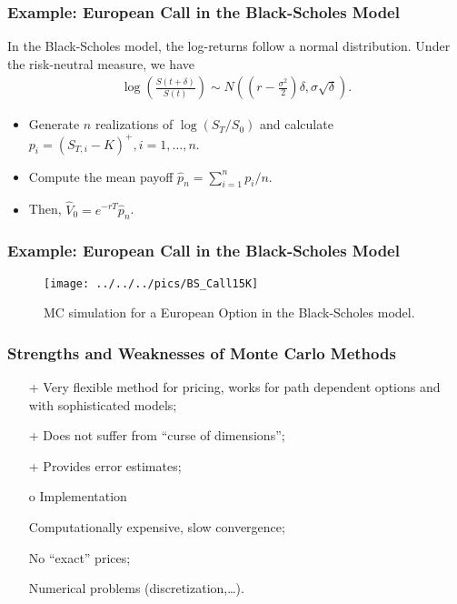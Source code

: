 \begin{frame}[fragile]
\frametitle{Example: European Call in the Black-Scholes Model}
In the Black-Scholes model, the log-returns follow a normal distribution. Under
the risk-neutral measure, we have
\begin{align*}
  \log\left(\frac{S(t+\delta)}{S(t)} \right) \sim
  N\left(\left( r-\frac{\sigma^2}{2}\right)\delta,\sigma \sqrt{\delta}\right).
\end{align*}
\begin{itemize}
  \item Generate $n$ realizations of $\log(S_{T}/S_0)$ and calculate
  $p_i=(S_{T,i}-K)^+, i=1,\ldots,n$.
  \item Compute the mean payoff $\hat{p}_n=\sum_{i=1}^n p_i/n$.
  \item Then, $\hat{V}_0 = e^{-rT}\hat{p}_n$.
\end{itemize}
\end{frame}



\begin{frame}[fragile]
\frametitle{Example: European Call in the Black-Scholes Model}
\begin{figure}[htp]
\begin{center}
  \texttt{[image: ../../../pics/BS\_Call15K]}
  \caption{MC simulation for a European Option in the Black-Scholes model.}
\end{center}
\end{figure}
\end{frame}


\begin{frame}[fragile]
\frametitle{Strengths and Weaknesses of Monte Carlo Methods}
\begin{itemize}
  \item[+] Very flexible method for pricing, works for path dependent options
  and with sophisticated models;
  \item[+] Does not suffer from ``curse of dimensions'';
  \item[+] Provides error estimates;
  \item[o\hspace{1px}] Implementation
  \item[\textendash\hspace{1px}] Computationally expensive, slow convergence;
  \item[\textendash\hspace{1px}] No ``exact'' prices;
  \item[\textendash\hspace{1px}] Numerical problems (discretization,\ldots).
\end{itemize}
\end{frame}



